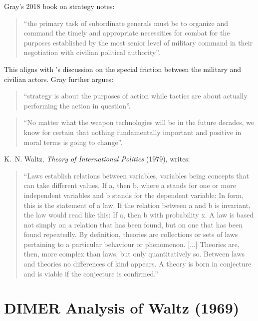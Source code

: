 
Gray's 2018 book on strategy \parencite{GRAY_2018} notes:

\begin{quote}
	``the primary task of subordinate generals must be to organize and command the timely and appropriate necessities for combat for the purposes established by the most senior level of military command in their negotiation with civilian political authority''.
\end{quote}

This aligns with \parencite{COHEN_2002}'s discussion on the special friction between the military and civilian actors. Gray further argues:

\begin{quote}
	``strategy is about the purposes of action while tactics are about actually performing the action in question''. 
\end{quote}

\begin{quote}
	``No matter what the weapon technologies will be in the future decades, we know for certain that nothing fundamentally important and positive in moral terms is going to change''.
\end{quote}

K.~N. Waltz, \textit{Theory of International Politics} (1979), writes:

\begin{quote}
	``Laws establish relations between variables, variables being concepts that can take different values. If a, then b, where a stands for one or more independent variables and b stands for the dependent variable: In form, this is the statement of a law. If the relation between a and b is invariant, the law would read like this: If a, then b with probability x. A law is based not simply on a relation that has been found, but on one that has been found repeatedly. By definition, theories are collections or sets of laws pertaining to a particular behaviour or phenomenon. [...] Theories are, then, more complex than laws, but only quantitatively so. Between laws and theories no differences of kind appears. A theory is born in conjecture and is viable if the conjecture is confirmed.''
\end{quote}


\section*{DIMER Analysis of Waltz (1969)}

